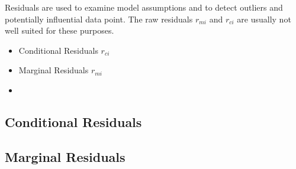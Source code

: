 \documentclass[Chap5amain.tex]{subfiles}
\begin{document}
Residuals are used to examine model assumptions and to detect outliers and potentially influential data
point. The raw residuals $r_{mi}$ and $r_{ci}$ are usually not well suited for these purposes.

\begin{itemize}
	\item Conditional Residuals $r_{ci}$
	\item Marginal Residuals $r_{mi}$
	\item 
\end{itemize}
\subsection*{Conditional Residuals}

\subsection*{Marginal Residuals}
\end{document}
